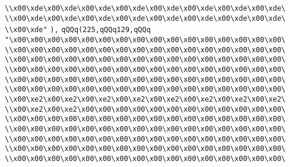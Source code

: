 \verb|\\x00\xde\x00\xde\x00\xde\x00\xde\x00\xde\x00\xde\x00\xde\x00\xde\|\newline
\verb|\\x00\xde\x00\xde\x00\xde\x00\xde\x00\xde\x00\xde\x00\xde\x00\xde\|\newline
\verb|\\x00\xde"|\newline
\verb|),|\newline
\verb|qQQq(225,qQQq129,qQQq|\newline
\verb|"\x00\x00\x00\x00\x00\x00\x00\x00\x00\x00\x00\x00\x00\x00\x00\x00\|\newline
\verb|\\x00\x00\x00\x00\x00\x00\x00\x00\x00\x00\x00\x00\x00\x00\x00\x00\|\newline
\verb|\\x00\x00\x00\x00\x00\x00\x00\x00\x00\x00\x00\x00\x00\x00\x00\x00\|\newline
\verb|\\x00\x00\x00\x00\x00\x00\x00\x00\x00\x00\x00\x00\x00\x00\x00\x00\|\newline
\verb|\\x00\x00\x00\x00\x00\x00\x00\x00\x00\x00\x00\x00\x00\x00\x00\x00\|\newline
\verb|\\x00\x00\x00\x00\x00\x00\x00\x00\x00\x00\x00\x00\x00\x00\x00\x00\|\newline
\verb|\\x00\xe2\x00\xe2\x00\xe2\x00\xe2\x00\xe2\x00\xe2\x00\xe2\x00\xe2\|\newline
\verb|\\x00\xe2\x00\xe2\x00\x00\x00\x00\x00\x00\x00\x00\x00\x00\x00\x00\|\newline
\verb|\\x00\x00\x00\x00\x00\x00\x00\x00\x00\x00\x00\x00\x00\x00\x00\x00\|\newline
\verb|\\x00\x00\x00\x00\x00\x00\x00\x00\x00\x00\x00\x00\x00\x00\x00\x00\|\newline
\verb|\\x00\x00\x00\x00\x00\x00\x00\x00\x00\x00\x00\x00\x00\x00\x00\x00\|\newline
\verb|\\x00\x00\x00\x00\x00\x00\x00\x00\x00\x00\x00\x00\x00\x00\x00\x00\|\newline
\verb|\\x00\x00\x00\x00\x00\x00\x00\x00\x00\x00\x00\x00\x00\x00\x00\x00\|\newline
